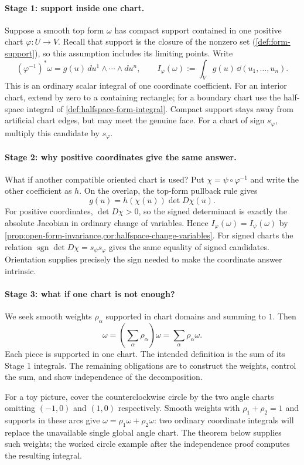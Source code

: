 \paragraph{Stage 1: support inside one chart.}
Suppose a smooth top form $\omega$ has compact support contained in one
positive chart $\varphi:U\to V$. Recall that support is the closure of
the nonzero set (\cref{def:form-support}), so this assumption includes
its limiting points. Write
\[
(\varphi^{-1})^*\omega=g(u)\,du^1\wedge\cdots\wedge du^n,
\qquad I_\varphi(\omega):=\int_V g(u)\,\dd(u_1,\ldots,u_n).
\]
This is an ordinary scalar integral of one coordinate coefficient.
For an interior chart, extend by zero to a containing rectangle; for a
boundary chart use the half-space integral of
\cref{def:halfspace-form-integral}. Compact support stays away from
artificial chart edges, but may meet the genuine face. For a chart of
sign $s_\varphi$, multiply this candidate by $s_\varphi$.

\paragraph{Stage 2: why positive coordinates give the same answer.}
What if another compatible oriented chart is used? Put
$\chi=\psi\circ\varphi^{-1}$ and write the other coefficient as $h$.
On the overlap, the top-form pullback rule gives
\[
g(u)=h(\chi(u))\det D\chi(u).
\]
For positive coordinates, $\det D\chi>0$, so the signed determinant
is exactly the absolute Jacobian in ordinary change of variables.
Hence $I_\varphi(\omega)=I_\psi(\omega)$ by
\cref{prop:open-form-invariance,cor:halfspace-change-variables}.
For signed charts the relation
$\operatorname{sgn}\det D\chi=s_\psi s_\varphi$ gives the same
equality of signed candidates. Orientation supplies precisely the sign
needed to make the coordinate answer intrinsic.

\paragraph{Stage 3: what if one chart is not enough?}
We seek smooth weights $\rho_\alpha$ supported in chart domains and
summing to $1$. Then
\[
\omega=\left(\sum_\alpha\rho_\alpha\right)\omega
=\sum_\alpha\rho_\alpha\omega.
\]
Each piece is supported in one chart. The intended definition is the
sum of its Stage 1 integrals. The remaining obligations are to construct
the weights, control the sum, and show independence of the decomposition.

For a toy picture, cover the counterclockwise circle by the two angle
charts omitting $(-1,0)$ and $(1,0)$ respectively. Smooth weights with
$\rho_1+\rho_2=1$ and supports in these arcs give
$\omega=\rho_1\omega+\rho_2\omega$: two ordinary coordinate integrals
will replace the unavailable single global angle chart. The theorem
below supplies such weights; the worked circle example after the
independence proof computes the resulting integral.


